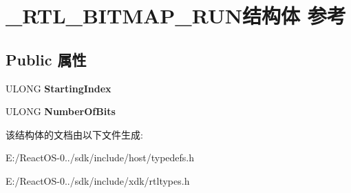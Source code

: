\hypertarget{struct___r_t_l___b_i_t_m_a_p___r_u_n}{}\section{\+\_\+\+R\+T\+L\+\_\+\+B\+I\+T\+M\+A\+P\+\_\+\+R\+U\+N结构体 参考}
\label{struct___r_t_l___b_i_t_m_a_p___r_u_n}
\subsection*{Public 属性}
\begin{DoxyCompactItemize}
\item 
\mbox{\label{struct___r_t_l___b_i_t_m_a_p___r_u_n_a089495d92b227c68fcdbfd0816a771dd}} 
U\+L\+O\+NG {\bfseries Starting\+Index}
\item 
\mbox{\label{struct___r_t_l___b_i_t_m_a_p___r_u_n_a016657ef3542db5b6c44843b7212c830}} 
U\+L\+O\+NG {\bfseries Number\+Of\+Bits}
\end{DoxyCompactItemize}


该结构体的文档由以下文件生成\+:\begin{DoxyCompactItemize}
\item 
E\+:/\+React\+O\+S-\/0../sdk/include/host/typedefs.\+h\item 
E\+:/\+React\+O\+S-\/0../sdk/include/xdk/rtltypes.\+h\end{DoxyCompactItemize}
